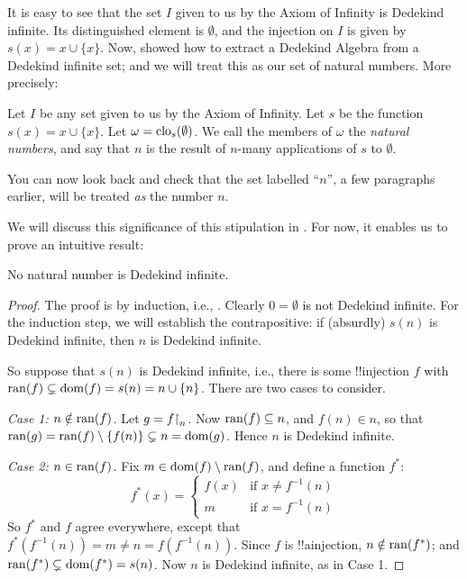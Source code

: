 \documentclass[../../../include/open-logic-section]{subfiles}
\begin{document}
It is easy to see that the set $I$ given to us by the Axiom of
Infinity is Dedekind infinite. Its distinguished element is
$\emptyset$, and the injection on $I$ is given by $s(x) = x\cup
\{x\}$. Now,
 showed
how to extract a Dedekind Algebra from a Dedekind infinite set; and we
will treat this as our set of natural numbers. More precisely:
\begin{defn}
Let $I$ be any set given to us by the Axiom of Infinity. Let $s$
be the function $s(x) = x \cup \{x\}$. Let $\omega =
\mathrm{clo}_{s}(\emptyset)$. We call the members of $\omega$ the
\emph{natural numbers}, and say that $n$ is the result of $n$-many
applications of $s$ to $\emptyset$.
\end{defn}

You can now look back and check that the set labelled ``$n$'', a few
paragraphs earlier, will be treated \emph{as} the number $n$. 

We will discuss this significance of this stipulation in
. For now, it enables us to prove an
intuitive result:

\begin{prop}
No natural number is Dedekind infinite.
\end{prop}

\begin{proof}
The proof is by induction, i.e.,
. Clearly $0
= \emptyset$ is not Dedekind infinite. For the induction step, we will
establish the contrapositive: if (absurdly) $s(n)$ is Dedekind
infinite, then $n$ is Dedekind infinite. 

So suppose that $s(n)$ is Dedekind infinite, i.e., there is some
!!{injection} $f$ with $\mathrm{ran}(f)\subsetneq \mathrm{dom}(f) = s(n) = n \cup
\{n\}$. There are two cases to consider. 

\emph{Case 1: $n \notin \mathrm{ran}(f)$.} Let $g = f\mathord{\restriction}_{n}$.
Now $\mathrm{ran}(f) \subseteq n$, and $f(n) \in n$, so that $\mathrm{ran}(g) =
\mathrm{ran}(f) \setminus \{f(n)\} \subsetneq n = \mathrm{dom}(g)$. Hence $n$ is
Dedekind infinite. 

\emph{Case 2: $n \in \mathrm{ran}(f)$.} Fix $m \in \mathrm{dom}(f) \setminus \mathrm{ran}(f)$, and define a function $f^*$:
\[
f^*(x) = 
	\begin{cases}
		f(x) & \text{if $x \neq f^{-1}(n)$}\\
		m & \text{if $x = f^{-1}(n)$}
	\end{cases}
\]
So $f^*$ and $f$ agree everywhere, except that $f^*(f^{-1}(n)) = m
\neq n = f(f^{-1}(n))$. Since $f$ is !!a{injection}, $n \notin
\mathrm{ran}(f^*)$; and $\mathrm{ran}(f^*) \subsetneq \mathrm{dom}(f^*) = s(n)$. Now $n$ is
Dedekind infinite, as in Case 1.
\end{proof}
\end{document}
